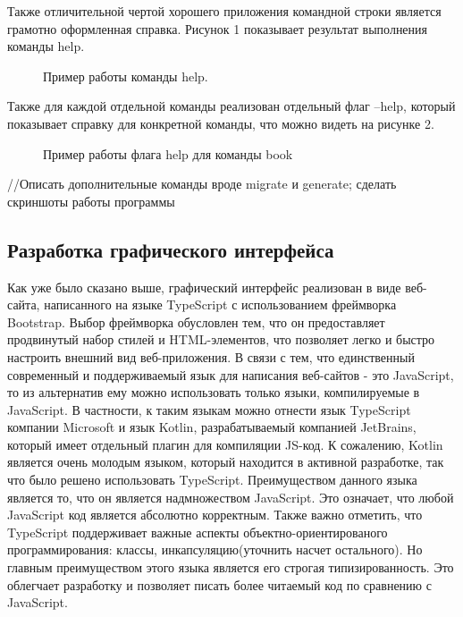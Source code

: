 Также отличительной чертой хорошего приложения командной строки является грамотно оформленная справка.
Рисунок 1 показывает результат выполнения команды help. 

\begin{figure}[h]
    \caption{Пример работы команды help.}
    \label{ris:image}
\end{figure}

Также для каждой отдельной команды реализован
отдельный флаг --help, который показывает справку для конкретной команды, что можно видеть на рисунке 2. 

\begin{figure}[h]
\caption{Пример работы флага help для команды book}
\label{ris:image}
\end{figure}


//Описать дополнительные команды вроде migrate и generate; сделать скриншоты работы программы

\subsection*{Разработка графического интерфейса}

Как уже было сказано выше, графический интерфейс реализован в виде веб-сайта, написанного на языке TypeScript с 
использованием фреймворка Bootstrap.
Выбор фреймворка обусловлен тем, что он предоставляет продвинутый набор стилей и HTML-элементов, что позволяет 
легко и быстро настроить внешний вид веб-приложения.
В связи с тем, что единственный современный и поддерживаемый язык для написания веб-сайтов - это JavaScript, то 
из альтернатив ему можно использовать только языки, компилируемые в JavaScript. В частности, к таким языкам можно 
отнести язык TypeScript компании Microsoft и язык Kotlin, разрабатываемый компанией JetBrains, который имеет 
отдельный плагин для компиляции JS-код. К сожалению, Kotlin является очень молодым языком, который находится в 
активной разработке, так что было решено использовать TypeScript. Преимуществом данного языка является то, что 
он является надмножеством JavaScript. Это означает, что любой JavaScript код является абсолютно корректным. Также 
важно отметить, что TypeScript поддерживает важные аспекты объектно-ориентированого программирования: классы, 
инкапсуляцию(уточнить насчет остального). Но главным преимуществом этого языка является его строгая типизированность. 
Это облегчает разработку и позволяет писать более читаемый код по сравнению с JavaScript.

